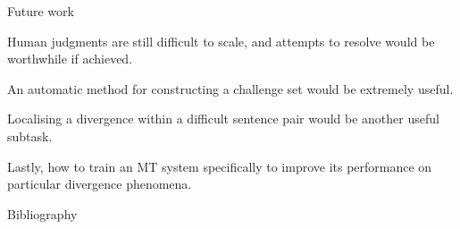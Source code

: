 \documentclass{beamer}
\begin{document}
\begin{frame}{Future work}

  Human judgments are still difficult to scale, and attempts to resolve would be worthwhile if achieved.

  \medskip

  An automatic method for constructing a challenge set would be extremely useful.

  \medskip

  Localising a divergence within a difficult sentence pair would be another useful subtask.

  \medskip

  Lastly, how to train an MT system specifically to improve its performance on particular divergence phenomena.

\end{frame}

\begin{frame}[allowframebreaks]{Bibliography}

  \printbibliography

\end{frame}
\end{document}

